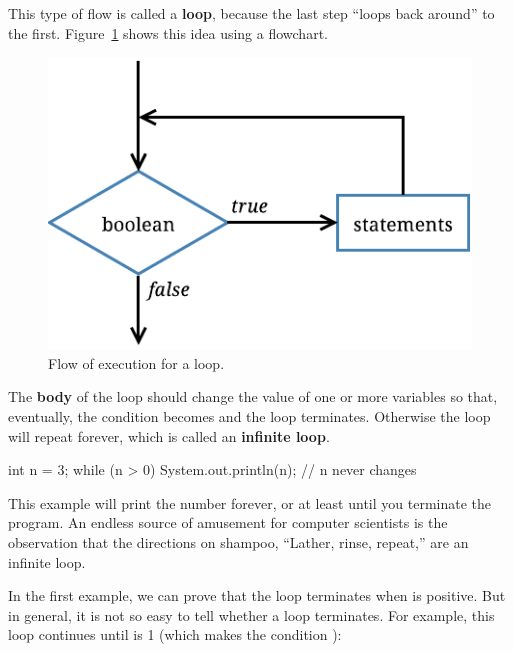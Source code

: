 
This type of flow is called a {\bf loop}, because the last step ``loops back around'' to the first.
Figure~\ref{fig.while} shows this idea using a flowchart.

\begin{figure}[!ht]
\begin{center}
\includegraphics[scale=0.9]{figs/while.pdf}
\caption{Flow of execution for a  loop.}
\label{fig.while}
\end{center}
\end{figure}


The {\bf body} of the loop should change the value of one or more variables so that, eventually, the condition becomes  and the loop terminates.
Otherwise the loop will repeat forever, which is called an {\bf infinite loop}.

\begin{code}
int n = 3;
while (n > 0) {
    System.out.println(n);
    // n never changes
}
\end{code}

This example will print the number  forever, or at least until you terminate the program.
An endless source of amusement for computer scientists is the observation that the directions on shampoo, ``Lather, rinse, repeat,'' are an infinite loop.

In the first example, we can prove that the loop terminates when  is positive.
But in general, it is not so easy to tell whether a loop terminates.
For example, this loop continues until  is 1 (which makes the condition ):


